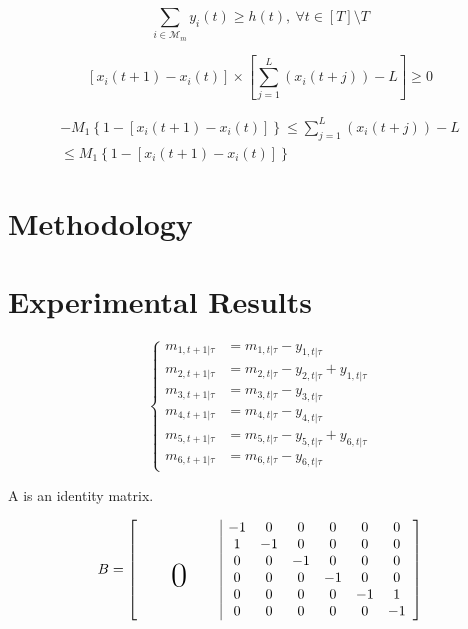 \documentclass[english]{cccconf}
\begin{document}
\begin{equation}\label{fuel consumption constraint}
  \sum_{i\in \mathcal{M}_{m}}y_i(t) \geq h(t), ~\forall t \in [T]\setminus T
\end{equation}

\begin{equation}\label{continue constraint - original}
  [x_i(t+1) - x_i(t)]\times\left[\sum_{j=1}^L(x_i(t+j))-L\right]\geq 0
\end{equation}

\begin{equation}\label{continue constraint}
\begin{split}
    -M_1\left\{1-[x_i(t+1)-x_i(t)]\right\} \leq \sum_{j=1}^L(x_i(t+j))-L \\ \leq M_1\left\{1-[x_i(t+1)-x_i(t)]\right\}
\end{split}
\end{equation}






\section{Methodology}

\section{Experimental Results}

\begin{equation}
\left\{
\begin{aligned}
m_{1,t+1|\tau} &= m_{1, t|\tau}-y_{1, t|\tau}\\
m_{2,t+1|\tau} &= m_{2, t|\tau} - y_{2, t|\tau} +y_{1, t|\tau}\\
m_{3,t+1|\tau} &= m_{3, t|\tau} - y_{3, t|\tau}\\
m_{4,t+1|\tau} &= m_{4, t|\tau} - y_{4, t|\tau}\\
m_{5,t+1|\tau} &= m_{5, t|\tau} - y_{5, t|\tau} +y_{6, t|\tau}\\
m_{6,t+1|\tau} &= m_{6, t|\tau} -y_{6, t|\tau}
\end{aligned}
\right.
\end{equation}

A is an identity matrix.

\begin{equation}
B = 
\left[\begin{array}{cccccc|cccccc}
  & & & & & & -1 & 0 & 0 & 0 & 0 & 0 \\
  & & & & & & 1 & -1 & 0 & 0 & 0 & 0 \\
  & & & & & & 0 & 0 & -1 & 0 & 0 & 0 \\
  & & & & & & 0 & 0 & 0 & -1 & 0 & 0 \\
  \multicolumn{6}{c|}{\raisebox{2ex}[0pt]{\Huge0}} & 0 & 0 & 0 & 0 & -1 & 1 \\
  & & & & & & 0 & 0 & 0 & 0 & 0 & -1 \\
\end{array}\right]
\end{equation}
\end{document}
